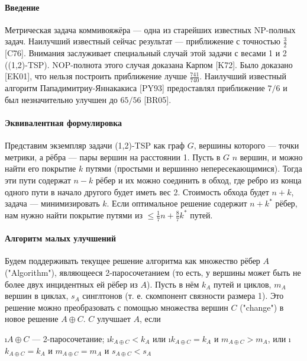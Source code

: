 

\date{}




\paragraph{Введение}
Метрическая задача коммивояжёра --- одна из старейших известных NP-полных задач. Наилучший известный сейчас результат --- приближение с точностью $\frac{3}{2}$[C76]. Внимания заслуживает специальный случай этой задачи с весами 1 и 2 ((1,2)-TSP). NOP-полнота этого случая доказана Карпом [K72]. 
Было доказано [EK01], что нельзя построить приближение лучше $\frac{741}{740}$. Наилучший известный алгоритм Пападимитриу-Яннакакиса [PY93] предоставлял приближение $7/6$ и был незначительно улучшен до $65/56$ [BR05]. 
\paragraph{Эквивалентная формулировка}
Представим экземпляр задачи (1,2)-TSP как граф $G$, вершины которого --- точки метрики, а рёбра --- пары вершин на расстоянии 1. Пусть в $G$ $n$ вершин, и можно найти его покрытие $k$ путями (простыми и вершинно непересекающимися). Тогда эти пути содержат $n-k$ рёбер и их можно соединить в обход, где ребро из конца одного пути в начало другого будет иметь вес 2. Стоимость обхода будет $n+k$, задача --- минимизировать $k$. Если оптимальное решение содержит $n+k^*$ рёбер, нам нужно найти покрытие путями из $\le \frac{1}{7}n+\frac{8}{7}k^*$ путей.

\paragraph{Алгоритм малых улучшений}
Будем поддерживать текущее решение алгоритма как множество рёбер $A$ ("Algorithm"), являющееся 2-паросочетанием (то есть, у вершины может быть не более двух инцидентных ей рёбер из $A$). Пусть в нём $k_A$ путей и циклов, $m_A$ вершин в циклах, $s_A$ синглтонов (т. е. скомпонент связности размера 1). Это решение можно преобразовать с помощью множества вершин $C$ ("change") в новое решение $A \oplus C$. $C$ улучшает $A$, если 
\begin{enumerate}
	\i $A \oplus C$ --- 2-паросочетание;
	\i $k_{A \oplus C} < k_A$ или
	\i $k_{A \oplus C} = k_A$ и $m_{A \oplus C} > m_A$, или
	\i $k_{A \oplus C} = k_A$ и $m_{A \oplus C} = m_A$ и $s_{A \oplus C} < s_A$
\end{enumerate}

